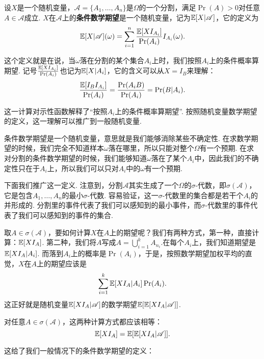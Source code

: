 \begin{definition}[基于分割的条件数学期望]\label{def:conditional-expectation}
设$X$是一个随机变量，$\mathscr{A}=\{A_1,\dots,A_n\}$是$\Omega$的一个分割，满足$\Pr(A)>0$对任意$A\in\mathscr{A}$成立. $X$在$\mathscr{A}$上的\textbf{条件数学期望}是一个随机变量，记为$\mathbb{E}[X|\mathscr{A}]$，它的定义为
\[\mathbb{E}[X|\mathscr{A}](\omega)=\sum_{i=1}^n \frac{\mathbb{E}[XI_{A_i}]}{\Pr(A_i)}I_{A_i}(\omega).\]
\end{definition}
这个定义就是在说，当$\omega$落在分割的某个集合$A_i$上时，我们按照$A_i$上的条件概率算期望. 记号$\frac{\mathbb{E}[XI_{A_i}]}{\Pr(A_i)}$也记为$\mathbb{E}[X|A_i]$，它的含义可以从$X=I_B$来理解：
\[\frac{\mathbb{E}[I_{B}I_{A_i}]}{\Pr(A_i)}=\frac{\Pr(A_iB)}{\Pr(A_i)}=\Pr(B|A_i).\]

这一计算对示性函数解释了“按照$A_i$上的条件概率算期望”. 按照随机变量数学期望的定义，这一理解可以推广到一般随机变量.  

条件数学期望是一个随机变量，意思就是我们能够消除某些不确定性. 在求数学期望的时候，我们完全不知道样本$\omega$落在哪里，所以只能对整个$\Omega$有一个预期. 在求对分割的条件数学期望的时候，我们能够知道$\omega$落在了某个$A_i$中，因此我们的不确定性只在于$A_i$上，所以我们可以只对$A_i$中的$\omega$有一个预期. 

下面我们推广这一定义. 注意到，分割$\mathscr{A}$其实生成了一个$\Omega$的$\sigma$-代数，即$\sigma(\mathscr{A})$，它是包含$A_1,\dots,A_n$的最小$\sigma$-代数. 容易验证，这一$\sigma$-代数里的集合都是若干个$A_i$的并形成的. 分割里的事件代表了我们可以感知到的最小事件，而$\sigma$-代数里的事件代表了我们可以感知到的事件的集合. 

取$A\in\sigma(\mathscr{A})$，要如何计算$X$在$A$上的期望呢？我们有两种方式，第一种，直接计算：$\mathbb{E}[XI_A]$. 第二种，我们将$A$写成$A=\bigcup_{i=1}^k A_{n_i}$.在每个$A_i$上，我们知道期望是$\mathbb{E}[XI_A|A_i]$. 而落到$A_i$上的概率是$\Pr(A_i)$，于是，按照数学期望加权平均的直觉，$X$在$A$上的期望应该是
\[\sum_{i=1}^k \mathbb{E}[XI_A|A_i]\Pr(A_i).\]
这正好就是随机变量$\mathbb{E}[XI_A|\mathscr{A}]$的数学期望$\mathbb{E}[\mathbb{E}[XI_A|\mathscr{A}]]$.

对任意$A\in\sigma(\mathscr{A})$，这两种计算方式都应该相等：
\begin{equation}
    \mathbb{E}[XI_A]=\mathbb{E}[\mathbb{E}[XI_A|\mathscr{A}]].\label{eq:conditional-expectation}
\end{equation}

这给了我们一般情况下的条件数学期望的定义：

\newcommand{\G}{\mathscr{G}}

